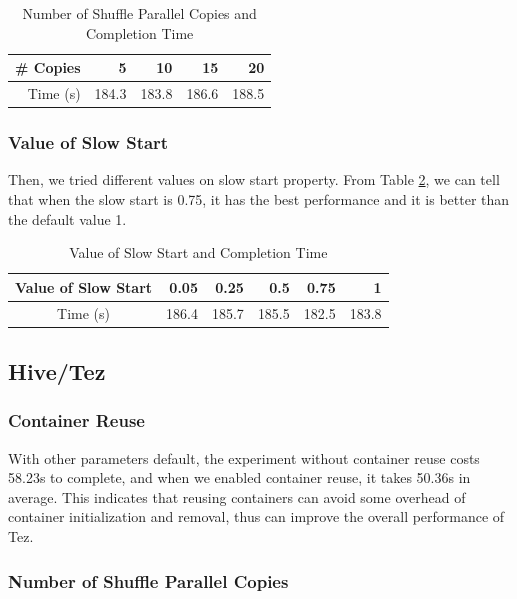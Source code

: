 \documentclass[10pt]{article}
\begin{document}
\begin{table}[htbp]
  \centering
  \caption{Number of Shuffle Parallel Copies and Completion Time}
    \begin{tabular}{rrrrr}
    \toprule
    \# Copies & 5     & 10    & 15    & 20 \\
    \midrule
    Time (s) & 184.3 & 183.8 & 186.6 & 188.5 \\
    \bottomrule
    \end{tabular}%
  \label{tab:num_of_parallel}%
\end{table}%



\subsubsection{Value of Slow Start}

Then, we tried different values on slow start property. From Table \ref{tab:val_of_slow}, we can tell that when the slow start is 0.75, it has the best performance and it is better than the default value 1.

\begin{table}[htbp]
  \centering
  \caption{Value of Slow Start and Completion Time}
    \begin{tabular}{crrrrr}
    \toprule
    Value of Slow Start & 0.05  & 0.25  & 0.5   & 0.75  & 1 \\
    \midrule
    Time (s) & 186.4 & 185.7 & 185.5 & 182.5 & 183.8 \\
    \bottomrule
    \end{tabular}%
  \label{tab:val_of_slow}%
\end{table}%


 

\subsection{Hive/Tez}
\subsubsection{Container Reuse}
With other parameters default, the experiment without container reuse costs 58.23s to complete, and when we enabled container reuse, it takes 50.36s in average. This indicates that reusing containers can avoid some overhead of container initialization and removal, thus can improve the overall performance of Tez.

\subsubsection{Number of Shuffle Parallel Copies}
\end{document}
